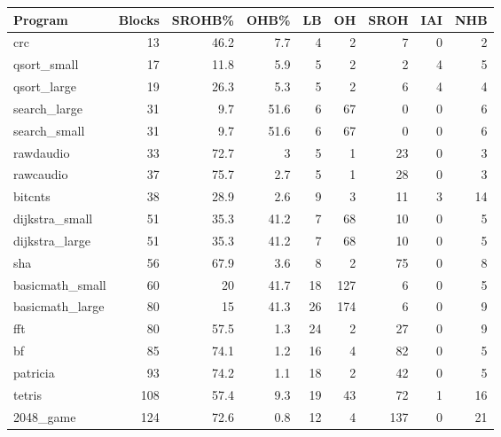 \begin{tabular}{|l|r|r|r|r|r|r|r|r|}
\hline
 Program         &   Blocks &   SROHB\% &   OHB\% &   LB &   OH &   SROH &   IAI &   NHB \\
\hline
 crc             &       13 &     46.2 &    7.7 &    4 &    2 &      7 &     0 &     2 \\
\hline
 qsort\_small     &       17 &     11.8 &    5.9 &    5 &    2 &      2 &     4 &     5 \\
\hline
 qsort\_large     &       19 &     26.3 &    5.3 &    5 &    2 &      6 &     4 &     4 \\
\hline
 search\_large    &       31 &      9.7 &   51.6 &    6 &   67 &      0 &     0 &     6 \\
\hline
 search\_small    &       31 &      9.7 &   51.6 &    6 &   67 &      0 &     0 &     6 \\
\hline
 rawdaudio       &       33 &     72.7 &    3   &    5 &    1 &     23 &     0 &     3 \\
\hline
 rawcaudio       &       37 &     75.7 &    2.7 &    5 &    1 &     28 &     0 &     3 \\
\hline
 bitcnts         &       38 &     28.9 &    2.6 &    9 &    3 &     11 &     3 &    14 \\
\hline
 dijkstra\_small  &       51 &     35.3 &   41.2 &    7 &   68 &     10 &     0 &     5 \\
\hline
 dijkstra\_large  &       51 &     35.3 &   41.2 &    7 &   68 &     10 &     0 &     5 \\
\hline
 sha             &       56 &     67.9 &    3.6 &    8 &    2 &     75 &     0 &     8 \\
\hline
 basicmath\_small &       60 &     20   &   41.7 &   18 &  127 &      6 &     0 &     5 \\
\hline
 basicmath\_large &       80 &     15   &   41.3 &   26 &  174 &      6 &     0 &     9 \\
\hline
 fft             &       80 &     57.5 &    1.3 &   24 &    2 &     27 &     0 &     9 \\
\hline
 bf              &       85 &     74.1 &    1.2 &   16 &    4 &     82 &     0 &     5 \\
\hline
 patricia        &       93 &     74.2 &    1.1 &   18 &    2 &     42 &     0 &     5 \\
\hline
 tetris          &      108 &     57.4 &    9.3 &   19 &   43 &     72 &     1 &    16 \\
\hline
 2048\_game       &      124 &     72.6 &    0.8 &   12 &    4 &    137 &     0 &    21 \\

\end{tabular}
